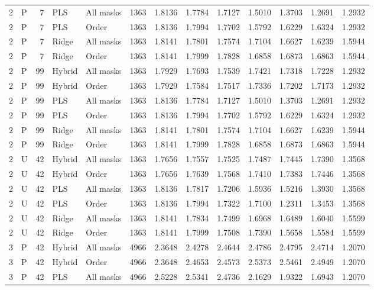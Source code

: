 \documentclass[10pt,a4paper]{article}
\begin{document}
\begin{longtable}{rlrllrrrrrrrr}
2 & P & 7 & PLS & All masks & 1363 & 1.8136 & 1.7784 & 1.7127 & 1.5010 & 1.3703 & 1.2691 & 1.2932 \\
2 & P & 7 & PLS & Order & 1363 & 1.8136 & 1.7994 & 1.7702 & 1.5792 & 1.6229 & 1.6324 & 1.2932 \\
2 & P & 7 & Ridge & All masks & 1363 & 1.8141 & 1.7801 & 1.7574 & 1.7104 & 1.6627 & 1.6239 & 1.5944 \\
2 & P & 7 & Ridge & Order & 1363 & 1.8141 & 1.7999 & 1.7828 & 1.6858 & 1.6873 & 1.6863 & 1.5944 \\
2 & P & 99 & Hybrid & All masks & 1363 & 1.7929 & 1.7693 & 1.7539 & 1.7421 & 1.7318 & 1.7228 & 1.2932 \\
2 & P & 99 & Hybrid & Order & 1363 & 1.7929 & 1.7584 & 1.7517 & 1.7336 & 1.7202 & 1.7173 & 1.2932 \\
2 & P & 99 & PLS & All masks & 1363 & 1.8136 & 1.7784 & 1.7127 & 1.5010 & 1.3703 & 1.2691 & 1.2932 \\
2 & P & 99 & PLS & Order & 1363 & 1.8136 & 1.7994 & 1.7702 & 1.5792 & 1.6229 & 1.6324 & 1.2932 \\
2 & P & 99 & Ridge & All masks & 1363 & 1.8141 & 1.7801 & 1.7574 & 1.7104 & 1.6627 & 1.6239 & 1.5944 \\
2 & P & 99 & Ridge & Order & 1363 & 1.8141 & 1.7999 & 1.7828 & 1.6858 & 1.6873 & 1.6863 & 1.5944 \\
2 & U & 42 & Hybrid & All masks & 1363 & 1.7656 & 1.7557 & 1.7525 & 1.7487 & 1.7445 & 1.7390 & 1.3568 \\
2 & U & 42 & Hybrid & Order & 1363 & 1.7656 & 1.7639 & 1.7568 & 1.7410 & 1.7383 & 1.7446 & 1.3568 \\
2 & U & 42 & PLS & All masks & 1363 & 1.8136 & 1.7817 & 1.7206 & 1.5936 & 1.5216 & 1.3930 & 1.3568 \\
2 & U & 42 & PLS & Order & 1363 & 1.8136 & 1.7994 & 1.7322 & 1.7100 & 1.2311 & 1.3453 & 1.3568 \\
2 & U & 42 & Ridge & All masks & 1363 & 1.8141 & 1.7834 & 1.7499 & 1.6968 & 1.6489 & 1.6040 & 1.5599 \\
2 & U & 42 & Ridge & Order & 1363 & 1.8141 & 1.7999 & 1.7508 & 1.7390 & 1.5658 & 1.5584 & 1.5599 \\
3 & P & 42 & Hybrid & All masks & 4966 & 2.3648 & 2.4278 & 2.4644 & 2.4786 & 2.4795 & 2.4714 & 1.2070 \\
3 & P & 42 & Hybrid & Order & 4966 & 2.3648 & 2.4653 & 2.4573 & 2.5373 & 2.5461 & 2.4949 & 1.2070 \\
3 & P & 42 & PLS & All masks & 4966 & 2.5228 & 2.5341 & 2.4736 & 2.1629 & 1.9322 & 1.6943 & 1.2070 \\

\end{longtable}
\end{document}
